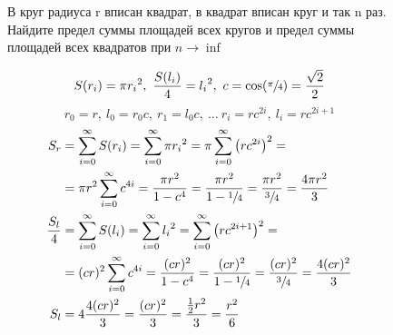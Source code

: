 \documentclass{article}
\begin{document}
\begin{figure}
  В круг радиуса r вписан квадрат, в квадрат вписан круг и так n раз.
  Найдите предел суммы площадей всех кругов и предел суммы
  площадей всех квадратов при $n \rightarrow \inf$





  
  $$ S(r_i) = \pi {r_i}^2,\ \frac{S(l_i)}{4} = {l_i}^2,\ c = \cos(\sfrac{\pi}{4}) = \frac{\sqrt{2}}{2}$$
  $$ r_0 = r,\ l_0 = r_0c,\ r_1 = l_0c,\ \ldots\ r_i = rc^{2i},\ l_i = rc^{2i + 1}$$
  \begin{equation}
    \begin{split}
      S_r & = \sum_{i=0}^{\infty} S(r_i) = \sum_{i=0}^{\infty} \pi {r_i}^2= \pi\sum_{i=0}^{\infty} {\left(rc^{2i}\right)}^2= \\
      & =\pi r^2\sum_{i=0}^{\infty} c^{4i} = \frac{\pi r^2}{1 - c^4} = \frac{\pi r^2}{1 - \sfrac{1}{4}} = \frac{\pi r^2}{\sfrac{3}{4}} = \frac{4\pi r^2}{3} \\
      \frac{S_l}{4} & = \sum_{i=0}^{\infty} S(l_i) = \sum_{i=0}^{\infty} {l_i}^2=\sum_{i=0}^{\infty} {\left(rc^{2i+1}\right)}^2= \\
      & =(cr)^2\sum_{i=0}^{\infty} c^{4i} = \frac{(cr)^2}{1 - c^4} = \frac{(cr)^2}{1 - \sfrac{1}{4}} = \frac{(cr)^2}{\sfrac{3}{4}} = \frac{4(cr)^2}{3}\\
      S_l &= 4\frac{4(cr)^2}{3} = \frac{(cr)^2}{3} = \frac{\frac{1}{2}r^2}{3} = \frac{r^2}{6}
    \end{split}
  \end{equation}
\end{figure}
\end{document}

